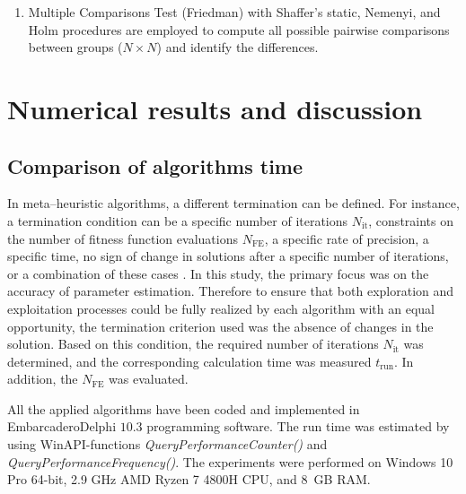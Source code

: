 \documentclass[a4paper,fleqn]{cas-dc}
\begin{document}
\begin{enumerate}[1.]
\item
Multiple Comparisons Test (Friedman) with Shaffer’s static, Nemenyi, and Holm procedures
are employed to compute all possible pairwise comparisons between groups ($N\times N$)
and identify the differences.

\end{enumerate}




\section{Numerical results and discussion}\label{Result}

\subsection{Comparison of algorithms time}
In meta--heuristic algorithms, a different termination can be defined.
For instance, a termination condition can be a specific number of iterations $N_\mathrm{it}$,
constraints on the number of fitness function evaluations $N_\mathrm{FE}$,
a specific rate of precision,
a specific time,
no sign of change in solutions after a specific number of iterations,
or a combination of these cases \cite{IntelligentChaoticClonal}.
In this study, the primary focus was on the accuracy of parameter estimation.
Therefore to ensure that both exploration and exploitation processes could be fully realized
by each algorithm with an equal opportunity, the termination criterion used was the absence of changes in the solution.
Based on this condition, the required number of iterations $N_\mathrm{it}$ was determined,
and the corresponding calculation time was measured $t_\mathrm{run}$.
In addition, the $N_\mathrm{FE}$ was evaluated.

All the applied algorithms have been coded and implemented in Embarcadero\textregistered Delphi $10.3$ programming software.
The run time was estimated by using WinAPI-functions \emph{QueryPerformanceCounter()} and \emph{QueryPerformanceFrequency()}.
The experiments were performed on Windows 10 Pro 64-bit,
2.9 GHz AMD Ryzen 7 4800H CPU, and 8~GB RAM.

\end{document}
